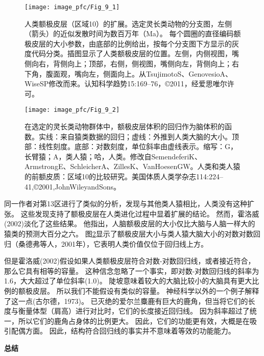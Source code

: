\begin{figure}[!htb]
	\centering
	\texttt{[image: image\_pfc/Fig\_9\_1]}
	\caption{人类额极皮层（区域10）的扩展。选定灵长类动物的分支图，左侧（箭头）的近似发散时间为数百万年（Ma）。
		每个圆圈的直径编码额极皮层的大小参数，由底部的比例给出，按每个分支图下方显示的灰度代码分类。插图显示了人类额极皮层的位置。左侧，内侧视图，嘴侧向右，背侧向上；顶部，右侧，侧视图，嘴侧向左，背侧向上；右下角，腹面观，嘴向左，侧面向上。从TsujimotoS、GenovesioA、WiseSP修改而来。认知科学趋势15:169–76，©2011，经爱思唯尔许可。\label{fig:fig_9_1}}
\end{figure}

\par
\begin{figure}[!htb]
	\centering
	\texttt{[image: image\_pfc/Fig\_9\_2]}
	\caption{在选定的灵长类动物群体中，额极皮层体积的回归作为脑体积的函数。实线：来自猿类数据的回归；虚线：外推到人类大脑的大小。顶部：线性刻度。底部：对数刻度，单位斜率由虚线表示。缩写：G，长臂猿；A，类人猿；哈，人类。修改自SemendeferiK、ArmstrongE、SchleicherA、ZillesK、VanHoesenGW。人类和类人猿的前额皮质：区域10的比较研究。美国体质人类学杂志114:224–41,©2001,JohnWileyandSons。\label{fig:fig_9_2}}
\end{figure}

\par

同一作者对第13区进行了类似的分析，发现与其他类人猿相比，人类没有这种扩张。
这些发现支持了额极皮层在人类进化过程中显着扩展的结论。
然而，霍洛威(2002)淡化了这些结果。
他指出，人脑额极皮层的大小仅比大脑与人脑一样大的猿类的预测大百分之六。
图\ref{fig:fig_9_2}显示了额极皮层大小与类人猿大脑大小的对数对数回归（桑德弗等人，2001年），它表明人类价值仅位于回归线上方。
\par


但是霍洛威(2002)假设如果人类额极皮层符合对数-对数回归线，或者接近符合，那么它具有相等的容量。
这种信念忽略了一个事实，即对数-对数回归线的斜率为1.6，大大超过了单位斜率(1.0)。
陡坡意味着较大的大脑比较小的大脑具有更大比例的额极皮层。
所以我们不能假设有类似的容量。
神经科学以外的一个例子解释了这一点(古尔德，1973)。
已灭绝的爱尔兰麋鹿有巨大的鹿角，但当将它们的长度与衡量体型（肩高）进行对比时，它们的长度接近回归线。
因为斜率超过了统一，所以它们的鹿角占身体的比例更大。
因此，它们的功能更有效，大概是在吸引配偶方面。
因此，结构符合回归线的事实并不意味着等效的功能能力。
\par



\textbf{总结}
\par


